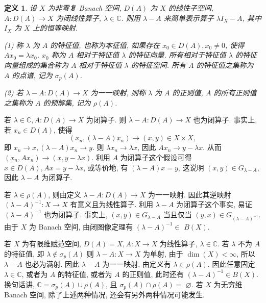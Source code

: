 \documentclass[openany]{ctexbook}
\theoremstyle{kaiti}
\newtheorem{definition}{定义}[section]
\theoremstyle{normal}
\begin{document}
\begin{definition}
设 $X$ 为非零复 Banach 空间, $D(A)$ 为 $X$ 的线性子空间, $A: D(A) \rightarrow X$ 为闭线性算子, $\lambda \in \mathbb{C}$. 则用 $\lambda-A$ 来简单表示算子 $\lambda I_{X}-A$, 其中 $I_{X}$ 为 $X$ 上的恒等映射.

(1) 称 $\lambda$ 为 $A$ 的特征值, 也称为本征值, 如果存在 $x_0 \in D(A), x_0 \neq 0$, 使得 $A x_0=\lambda x_0$. $x_0$ 称为 $A$ 相对于特征值 $\lambda$ 的特征向量. 所有相对于特征值 $\lambda$ 的特征向量组成的集合称为 $A$ 相对于特征值 $\lambda$ 的特征空间. 所有 $A$ 的特征值之集称为 $A$ 的点谱, 记为 $\sigma_{p}(A)$.

(2) 若 $\lambda-A: D(A) \rightarrow X$ 为一一映射, 则称 $\lambda$ 为 $A$ 的正则值, $A$ 的所有正则值之集称为 $A$ 的预解集, 记为 $\rho(A)$.
\end{definition}

若 $\lambda \in \mathbb{C}, A: D(A) \rightarrow X$ 为闭算子. 则 $\lambda-A: D(A) \rightarrow X$ 也为闭算子. 事实上, 若 $x_n \in D(A)$, 使得
$$
\left(x_n,(\lambda-A) x_n\right) \rightarrow(x, y) \in X \times X,
$$
即 $x_n \rightarrow x,(\lambda-A) x_n \rightarrow y$. 则 $\lambda x_n \rightarrow \lambda x$, 因此 $A x_n \rightarrow y-\lambda x$. 从而 $\left(x_n, A x_n\right) \rightarrow(x, y-\lambda x)$. 利用 $A$ 为闭算子这个假设可得 $x \in D(A), A x=y-\lambda x$, 或等价地, 有 $(\lambda-A) x=y$, 这说明 $(x, y) \in G_{\lambda-A}$, 因此 $\lambda-A$ 为闭算子.

若 $\lambda \in \rho(A)$, 则由定义 $\lambda-A: D(A) \rightarrow X$ 为一一映射. 因此其逆映射 $(\lambda-A)^{-1}: X \rightarrow X$ 有意义且为线性算子. 利用 $\lambda-A$ 为闭算子这个事实, 易证 $(\lambda-A)^{-1}$ 也为闭算子. 事实上, $(x, y) \in G_{\lambda-A}$ 当且仅当 $(y, x) \in G_{(\lambda-A)^{-1}}$. 由于 $X$ 为 Banach 空间, 由闭图像定理有 $(\lambda-A)^{-1} \in$ $B(X)$.

若 $X$ 为有限维赋范空间, $D(A)=X, A: X \rightarrow X$ 为线性算子, $\lambda \in \mathbb{C}$. 若 $\lambda$ 不为 $A$ 的特征值, 即 $\lambda \notin \sigma_{p}(A)$ 则 $\lambda-A: X \rightarrow X$ 为单射, 由于 $\operatorname{dim}(X)<\infty$, 所以 $\lambda-A$ 也必为满射. 因此 $\lambda-A$ 为一一映射. 由定义有 $\lambda \in \rho(A)$. 因此任意固定 $\lambda \in \mathbb{C}$, 或者为 $A$ 的特征值, 或者为 $A$ 的正则值, 此时还有 $(\lambda-A)^{-1} \in B(X)$. 换句话讲, $\mathbb{C}=\sigma_{p}(A) \cup \rho(A)$, 且 $\sigma_{p}(A) \cap \rho(A)=$ $\varnothing$. 若 $X$ 为无穷维 Banach 空间, 除了上述两种情况, 还会有另外两种情况可能发生.
\end{document}
